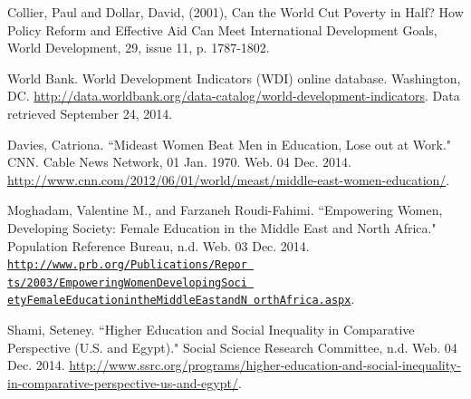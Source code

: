 \documentclass[fontsize=11pt, twocolumn]{article}
\begin{document}
\begin{thebibliography}{9}

Collier, Paul and Dollar, David, (2001), Can the World Cut Poverty in Half? How Policy Reform and Effective Aid Can Meet International Development Goals, World Development, 29, issue 11, p. 1787-1802.

World Bank. World Development Indicators (WDI) online database. Washington, DC. \url{http://data.worldbank.org/data-catalog/world-development-indicators}. Data retrieved September 24, 2014.

Davies, Catriona. ``Mideast Women Beat Men in Education, Lose out at Work." CNN. Cable News Network, 01 Jan. 1970. Web. 04 Dec. 2014. \url{http://www.cnn.com/2012/06/01/world/meast/middle-east-women-education/}.

Moghadam, Valentine M., and Farzaneh Roudi-Fahimi. ``Empowering Women, Developing Society: Female Education in the Middle East and North Africa." Population Reference Bureau, n.d. Web. 03 Dec. 2014. \href{http://www.prb.org/Publications/Reports/2003/EmpoweringWomenDevelopingSocietyFemaleEducationintheMiddleEastandNorthAfrica.aspx}{\tt{http://www.prb.org/Publications/Repor ts/2003/EmpoweringWomenDevelopingSoci etyFemaleEducationintheMiddleEastandN orthAfrica.aspx}}.

Shami, Seteney. ``Higher Education and Social Inequality in Comparative Perspective (U.S. and Egypt)." Social Science Research Committee, n.d. Web. 04 Dec. 2014. \url{http://www.ssrc.org/programs/higher-education-and-social-inequality-in-comparative-perspective-us-and-egypt/}.

\end{thebibliography}

\end{document}
